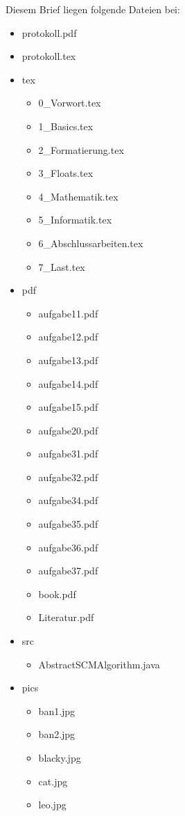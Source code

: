 \documentclass[11pt,ngerman,latin9]{g-brief}
\begin{document}
\begin{g-brief}

Diesem Brief liegen folgende Dateien bei:
\begin{itemize}
 \item protokoll.pdf
 
 \item protokoll.tex
 
 \item tex
 \begin{itemize}
  \item 0\_Vorwort.tex
  \item 1\_Basics.tex
  \item 2\_Formatierung.tex
  \item 3\_Floats.tex
  \item 4\_Mathematik.tex
  \item 5\_Informatik.tex
  \item 6\_Abschlussarbeiten.tex
  \item 7\_Last.tex
 \end{itemize}
\pagebreak
 \item pdf
 \begin{itemize}
  \item aufgabe11.pdf
  \item aufgabe12.pdf
  \item aufgabe13.pdf
  \item aufgabe14.pdf
  \item aufgabe15.pdf
  \item aufgabe20.pdf
  \item aufgabe31.pdf
  \item aufgabe32.pdf
  \item aufgabe34.pdf
  \item aufgabe35.pdf
  \item aufgabe36.pdf
  \item aufgabe37.pdf
  \item book.pdf
  \item Literatur.pdf
 \end{itemize}

 \item src
 \begin{itemize}
  \item AbstractSCMAlgorithm.java
 \end{itemize}
 
 \item pics
 \begin{itemize}
  \item ban1.jpg
  \item ban2.jpg
  \item blacky.jpg
  \item cat.jpg
  \item leo.jpg
 \end{itemize}


\end{itemize}
\end{g-brief}
\end{document}

